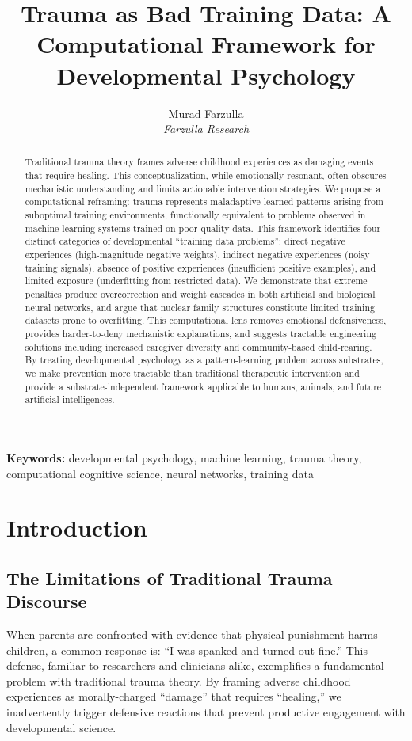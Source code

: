\documentclass{article}
\title{Trauma as Bad Training Data: A Computational Framework for Developmental Psychology}
\author{Murad Farzulla\\
\textit{Farzulla Research}}
\date{}
\begin{document}
\maketitle

\begin{abstract}
Traditional trauma theory frames adverse childhood experiences as damaging events that require healing. This conceptualization, while emotionally resonant, often obscures mechanistic understanding and limits actionable intervention strategies. We propose a computational reframing: trauma represents maladaptive learned patterns arising from suboptimal training environments, functionally equivalent to problems observed in machine learning systems trained on poor-quality data. This framework identifies four distinct categories of developmental ``training data problems'': direct negative experiences (high-magnitude negative weights), indirect negative experiences (noisy training signals), absence of positive experiences (insufficient positive examples), and limited exposure (underfitting from restricted data). We demonstrate that extreme penalties produce overcorrection and weight cascades in both artificial and biological neural networks, and argue that nuclear family structures constitute limited training datasets prone to overfitting. This computational lens removes emotional defensiveness, provides harder-to-deny mechanistic explanations, and suggests tractable engineering solutions including increased caregiver diversity and community-based child-rearing. By treating developmental psychology as a pattern-learning problem across substrates, we make prevention more tractable than traditional therapeutic intervention and provide a substrate-independent framework applicable to humans, animals, and future artificial intelligences.
\end{abstract}

\noindent\textbf{Keywords:} developmental psychology, machine learning, trauma theory, computational cognitive science, neural networks, training data

\section{Introduction}

\subsection{The Limitations of Traditional Trauma Discourse}

When parents are confronted with evidence that physical punishment harms children, a common response is: ``I was spanked and turned out fine.'' This defense, familiar to researchers and clinicians alike, exemplifies a fundamental problem with traditional trauma theory. By framing adverse childhood experiences as morally-charged ``damage'' that requires ``healing,'' we inadvertently trigger defensive reactions that prevent productive engagement with developmental science.
\end{document}
